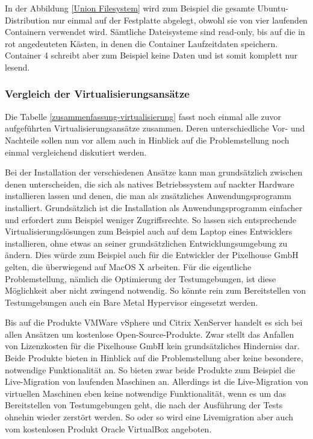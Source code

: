 In der Abbildung \ref{Union Filesystem} wird zum Beispiel die gesamte Ubuntu-Distribution nur einmal auf der Festplatte abgelegt, obwohl sie von vier laufenden Containern verwendet wird. Sämtliche Dateisysteme sind read-only, bis auf die in rot angedeuteten Kästen, in denen die Container Laufzeitdaten speichern. Container 4 schreibt aber zum Beispiel keine Daten und ist somit komplett nur lesend.

\subsubsection{Vergleich der Virtualisierungsansätze}

Die Tabelle \ref{zusammenfassung-virtualisierung} fasst noch einmal alle zuvor aufgeführten Virtualisierungsansätze zusammen. Deren unterschiedliche Vor- und Nachteile sollen nun vor allem auch in Hinblick auf die Problemstellung noch einmal vergleichend diskutiert werden.

Bei der Installation der verschiedenen Ansätze kann man grundsätzlich zwischen denen unterscheiden, die sich als natives Betriebssystem auf nackter Hardware installieren lassen und denen, die man als zusätzliches Anwendungsprogramm installiert. Grundsätzlich ist die Installation als Anwendungsprogramm einfacher und erfordert zum Beispiel weniger Zugriffsrechte. So lassen sich entsprechende Virtualisierungslösungen zum Beispiel auch auf dem Laptop eines Entwicklers installieren, ohne etwas an seiner grundsätzlichen Entwicklungsumgebung zu ändern. Dies würde zum Beispiel auch für die Entwickler der Pixelhouse GmbH gelten, die überwiegend auf MacOS X arbeiten. Für die eigentliche Problemstellung, nämlich die Optimierung der Testumgebungen, ist diese Möglichkeit aber nicht zwingend notwendig. So könnte rein zum Bereitstellen von Testumgebungen auch ein Bare Metal Hypervisor eingesetzt werden.

Bis auf die Produkte VMWare vSphere und Citrix XenServer handelt es sich bei allen Ansätzen um kostenlose Open-Source-Produkte. Zwar stellt das Anfallen von Lizenzkosten für die Pixelhouse GmbH kein grundsätzliches Hinderniss dar. Beide Produkte bieten in Hinblick auf die Problemstellung aber keine besondere, notwendige Funktionalität an. So bieten zwar beide Produkte zum Beispiel die Live-Migration von laufenden Maschinen an. Allerdings ist die Live-Migration von virtuellen Maschinen eben keine notwendige Funktionalität, wenn es um das Bereitstellen von Testumgebungen geht, die nach der Ausführung der Tests ohnehin wieder zerstört werden. So oder so wird eine Livemigration aber auch vom kostenlosen Produkt Oracle VirtualBox angeboten.

